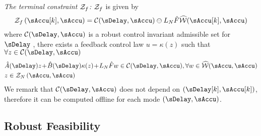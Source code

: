 \noindent\textit{The terminal constraint $\mathcal{Z}_{f}$:}
%
$\mathcal{Z}_{f}$ is given by %
\begin{equation}
\label{eq:RMPC1-Zf}
\ZSet_{f}\left(\sAccu[k],\sAccu\right)=\CCC(\sDelay,\sAccu)\ominus L_{N}\hat{F}\WhSet(\sAccu[k],\sAccu)
\end{equation}
where $\CCC(\sDelay,\sAccu)$ is a robust control invariant admissible
set for $\sDelay$ \cite{kerrigan00rcs}, \ie there exists a feedback control law $u=\kappa(z)$
such that $\forall z\in\CCC(\sDelay,\sAccu)$
\begin{subequations}
\label{eq:RMPC1-Zf-invariant}
\begin{align}
& \hat{A}(\sDelay)z \!+\! \hat{B}(\sDelay)\kappa(z) \!+\! L_{N}\hat{F}w\in\CCC(\sDelay,\sAccu), \forall w\in\WhSet(\sAccu,\sAccu)\label{eq:RMPC1-Zf-invariant-dyn}\\
& z\in\ZSet_{N}\left(\sAccu,\sAccu\right)\label{eq:RMPC1-Zf-invariant-z}
\end{align}
\end{subequations}
We remark that $\CCC(\sDelay,\sAccu)$ does not depend on $\left(\sDelay[k],\sAccu[k]\right)$, therefore it can be computed offline for each mode $\left(\sDelay,\sAccu\right)$.


\subsection{Robust Feasibility}



% 

